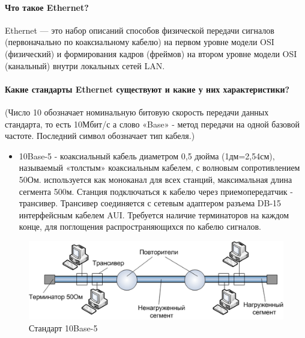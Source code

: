 \paragraph{Что такое Ethernet?}
    
Ethernet — это набор описаний способов физической передачи сигналов (первоначально по коаксиальному кабелю) на первом уровне модели OSI (физический) и формирования кадров (фреймов) на втором уровне модели OSI (канальный) внутри локальных сетей LAN. 


\paragraph{Какие стандарты Ethernet существуют и какие у них характеристики?}

(Число 10 обозначает номинальную битовую скорость передачи данных стандарта, то есть 10Мбит/с а слово «Base» - метод передачи на одной базовой частоте. Последний символ обозначает тип кабеля.)
    
\begin{itemize}
    \item 10Base-5 - коаксиальный кабель диаметром 0,5 дюйма (1дм=2,54см), называемый «толстым» коаксиальным кабелем, с волновым сопротивлением 50Ом. используется как моноканал для всех станций, максимальная длина сегмента 500м. Станция подключаться к кабелю через приемопередатчик - трансивер. Трансивер соединяется с сетевым адаптером разъема DB-15 интерфейсным кабелем AUI. Требуется наличие терминаторов на каждом конце, для поглощения распространяющихся по кабелю сигналов.
\end{itemize}
\begin{figure}[H]
	\begin{center}
		\includegraphics[scale=0.7]{fig/10Base-5.png}
		\caption{Стандарт 10Base-5}
		\label{pic:10Base-5} %
	\end{center}
\end{figure}

